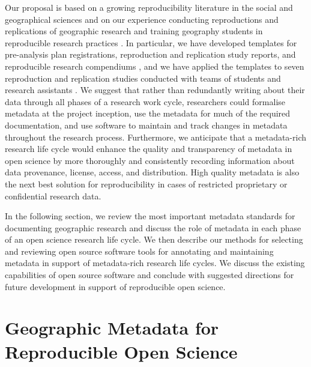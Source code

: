 \documentclass{isprs} %
\begin{document}
Our proposal is based on a growing reproducibility literature in the social and geographical sciences and on our experience conducting reproductions and replications of geographic research and training geography students in reproducible research practices \citep{Kedron_Holler_Bardin_Hilgendorf_2022}.
In particular, we have developed templates for pre-analysis plan registrations, reproduction and replication study reports, and reproducible research compendiums \citep{Kedron_Holler_2022}, and we have applied the templates to seven reproduction and replication studies conducted with teams of students and research assistants \citep{Kedron_Holler_Bardin_Hilgendorf_2022}.
We suggest that rather than redundantly writing about their data through all phases of a research work cycle, researchers could formalise metadata at the project inception, use the metadata for much of the required documentation, and use software to maintain and track changes in metadata throughout the research process.
Furthermore, we anticipate that a metadata-rich research life cycle would enhance the quality and transparency of metadata in open science by more thoroughly and consistently recording information about data provenance, license, access, and distribution.
High quality metadata is also the next best solution for reproducibility in cases of restricted proprietary or confidential research data.

In the following section, we review the most important metadata standards for documenting geographic research and discuss the role of metadata in each phase of an open science research life cycle.
We then describe our methods for selecting and reviewing open source software tools for annotating and maintaining metadata in support of metadata-rich research life cycles.
We discuss the existing capabilities of open source software and conclude with suggested directions for future development in support of reproducible open science.


\section{Geographic Metadata for Reproducible Open Science}\label{sec:Background}
\end{document}
